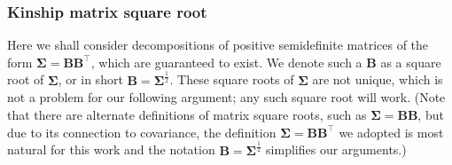 \documentclass[11pt]{article}
\newcommand{\kinMat}{%
  \ensuremath{%
    \mathbf{\Phi}
  }%
  \xspace%
}%
\newcommand{\kinMatEstNamed}[1]{%
  \ensuremath{%
    \mathbf{\hat{\Phi}}^\text{#1}
  }%
  \xspace%
}%
\newcommand{\kinMatStdLim}{%
  \kinMatEstNamed{std-lim}
}%
\begin{document}


  
  

\subsubsection{Kinship matrix square root}


Here we shall consider decompositions of positive semidefinite matrices of the form $\mathbf{\Sigma} = \mathbf{B} \mathbf{B}^\intercal$, which are guaranteed to exist.
We denote such a $\mathbf{B}$ as a square root of $\mathbf{\Sigma}$, or in short $\mathbf{B} = \mathbf{\Sigma}^\frac{1}{2}$.
These square roots of $\mathbf{\Sigma}$ are not unique, which is not a problem for our following argument; any such square root will work.
(Note that there are alternate definitions of matrix square roots, such as $\mathbf{\Sigma} = \mathbf{B} \mathbf{B}$, but due to its connection to covariance, the definition $\mathbf{\Sigma} = \mathbf{B} \mathbf{B}^\intercal$ we adopted is most natural for this work and the notation $\mathbf{B} = \mathbf{\Sigma}^\frac{1}{2}$ simplifies our arguments.)
\end{document}

